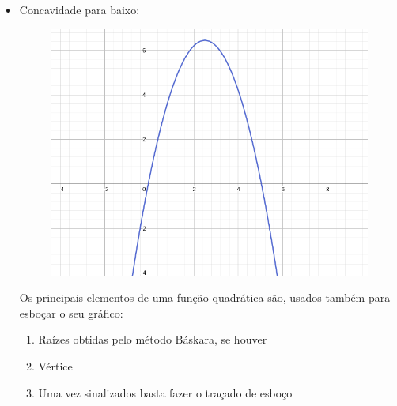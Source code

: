 \begin{multicols*}{2}
\begin{itemize}
\begin{figure}[H]
              \end{figure}
        \item Concavidade para baixo:
              \begin{figure}[H]
                  \centering
                  \includegraphics[scale=0.3]{assets/rafael/img17.png}
              \end{figure}
              Os principais elementos de uma função quadrática são, usados também para esboçar o seu gráfico:
              \begin{enumerate}
                  \item Raízes obtidas pelo método Báskara, se houver
                  \item Vértice
                  \item Uma vez sinalizados basta fazer o traçado de esboço
              \end{enumerate}

\end{itemize}
\end{multicols*}
